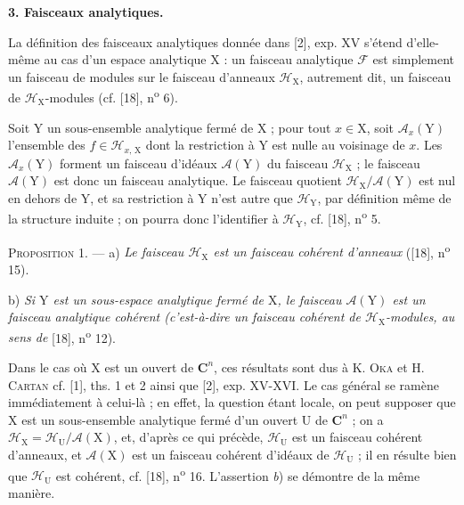\textbf{3. Faisceaux analytiques.}

La définition des faisceaux analytiques donnée dans [2], exp. XV s'étend d'elle-même au cas d'un espace analytique $\mathrm{X}$ : un faisceau analytique $\mathcal{F}$ est simplement un faisceau de modules sur le faisceau d'anneaux $\mathcal{H}_{\mathrm{X}}$, autrement dit, un faisceau de $\mathcal{H}_{\mathrm{X}}$-modules (cf. [18], n\textsuperscript{o} 6).

Soit $\mathrm{Y}$ un sous-ensemble analytique fermé de $\mathrm{X}$ ; pour tout $x \in \mathrm{X}$, soit $\mathcal{A}_x(\mathrm{Y})$ l'ensemble des $f \in \mathcal{H}_{x,\,\mathrm{X}}$ dont la restriction à $\mathrm{Y}$ est nulle au voisinage de $x$. Les $\mathcal{A}_x(\mathrm{Y})$ forment un faisceau d'idéaux $\mathcal{A}(\mathrm{Y})$ du faisceau $\mathcal{H}_{\mathrm{X}}$ ; le faisceau $\mathcal{A}(\mathrm{Y})$ est donc un faisceau analytique. Le faisceau quotient $\mathcal{H}_{\mathrm{X}}/\mathcal{A}(\mathrm{Y})$ est nul en dehors de $\mathrm{Y}$, et sa restriction à $\mathrm{Y}$ n'est autre que $\mathcal{H}_{\mathrm{Y}}$, par définition même de la structure induite ; on pourra donc l'identifier à $\mathcal{H}_{\mathrm{Y}}$, cf. [18], n\textsuperscript{o} 5.

\textsc{Proposition} 1. --- a) \textit{Le faisceau $\mathcal{H}_{\mathrm{X}}$ est un faisceau cohérent d'anneaux} ([18], n\textsuperscript{o} 15).

b) \textit{Si $\mathrm{Y}$ est un sous-espace analytique fermé de $\mathrm{X}$, le faisceau $\mathcal{A}(\mathrm{Y})$ est un faisceau analytique cohérent (c'est-à-dire un faisceau cohérent de $\mathcal{H}_{\mathrm{X}}$-modules, au sens de} [18], n\textsuperscript{o} 12).



Dans le cas où $\mathrm{X}$ est un ouvert de $\mathbf{C}^n$, ces résultats sont dus à K. \textsc{Oka} et H. \textsc{Cartan} cf. [1], ths. 1 et 2 ainsi que [2], exp. XV-XVI. Le cas général se ramène immédiatement à celui-là ; en effet, la question étant locale, on peut supposer que $\mathrm{X}$ est un sous-ensemble analytique fermé d'un ouvert $\mathrm{U}$ de $\mathbf{C}^n$ ; on a $\mathcal{H}_{\mathrm{X}} = \mathcal{H}_{\mathrm{U}}/\mathcal{A}(\mathrm{X})$, et, d'après ce qui précède, $\mathcal{H}_{\mathrm{U}}$ est un faisceau cohérent d'anneaux, et $\mathcal{A}(\mathrm{X})$ est un faisceau cohérent d'idéaux de $\mathcal{H}_{\mathrm{U}}$ ; il en résulte bien que $\mathcal{H}_{\mathrm{U}}$ est cohérent, cf. [18], n\textsuperscript{o} 16. L'assertion \textit{b}) se démontre de la même manière.

